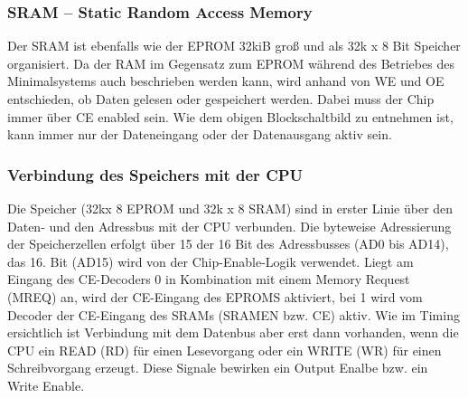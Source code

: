 \subsubsection{SRAM -- Static Random Access Memory}

Der SRAM ist ebenfalls wie der EPROM 32kiB groß und als 32k x 8 Bit Speicher organisiert. Da der RAM im Gegensatz zum EPROM während des Betriebes des Minimalsystems auch beschrieben werden kann, wird anhand von WE und OE entschieden, ob Daten gelesen oder gespeichert werden. Dabei muss der Chip immer über CE enabled sein. Wie dem obigen Blockschaltbild zu entnehmen ist, kann immer nur der Dateneingang oder der Datenausgang aktiv sein.

\subsubsection{Verbindung des Speichers mit der CPU}
Die Speicher (32kx 8 EPROM und 32k x 8 SRAM) sind in erster Linie über den Daten- und den Adressbus mit der CPU verbunden. Die byteweise Adressierung der Speicherzellen erfolgt über 15 der 16 Bit des Adressbusses (AD0 bis AD14), das 16. Bit (AD15) wird von der Chip-Enable-Logik verwendet. Liegt am Eingang des CE-Decoders 0 in Kombination mit einem Memory Request (MREQ) an, wird der CE-Eingang des EPROMS aktiviert, bei 1 wird vom Decoder der CE-Eingang des SRAMs (SRAMEN bzw. CE) aktiv. Wie im Timing ersichtlich ist Verbindung mit dem Datenbus aber erst dann vorhanden, wenn die CPU ein READ (RD) für einen Lesevorgang oder ein WRITE (WR) für einen Schreibvorgang erzeugt. Diese Signale bewirken ein Output Enalbe bzw. ein Write Enable.

